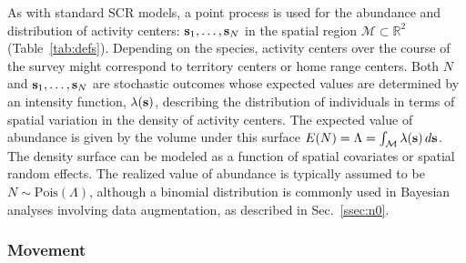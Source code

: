 \documentclass[12pt]{article}
\newcommand{\bs}{{\bf s}}
\begin{document}
As with standard SCR models, a point process is used for the 
abundance and distribution of activity centers: $\bs_1, \dots, \bs_N$
in the spatial region $\mathcal{M} \subset \mathbb{R}^2$
(Table~\ref{tab:defs}). 
Depending on the species, activity centers over the course of the
survey might correspond to territory centers or %
home range centers. Both $N$ and $\bs_1, \dots, \bs_N$ are
stochastic outcomes whose expected values are determined by an
intensity function, $\lambda(\bs)$, describing the distribution of
individuals in terms of spatial variation in the density of activity
centers.
The expected value of abundance is given by  the volume under
this surface 
$E(N) = \Lambda = \int_{\mathcal{M}} \lambda(\bs) \, d\bs$.
The density surface can be modeled as a function of spatial covariates
or spatial random effects. 
The realized value of abundance is
typically assumed to be $N \sim \mathrm{Pois}(\Lambda)$, although a
binomial distribution is commonly used in Bayesian analyses involving
data augmentation, %
as described in Sec.~\ref{ssec:n0}. 


\subsubsection{Movement}
\end{document}
